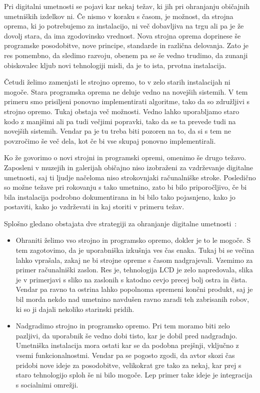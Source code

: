 \documentclass[a4paper, 12pt]{book}
\begin{document}
Pri digitalni umetnosti se pojavi kar nekaj težav, ki jih pri ohranjanju
običajnih umetniških izdelkov ni. Če nismo v koraku s časom, je možnost, da
strojna oprema, ki jo potrebujemo za instalacijo, ni več dobavljiva na trgu
ali pa je že dovolj stara, da ima zgodovinsko vrednost. Nova strojna oprema
doprinese še programske posodobitve, nove principe, standarde in različna
delovanja. Zato je res pomembno, da sledimo razvoju, obenem pa se še vedno
trudimo, da zunanji obiskovalec kljub novi tehnologiji misli, da je to ista,
prvotna instalacija.

Četudi želimo zamenjati le strojno opremo, to v zelo starih instalacijah
ni mogoče. Stara programska oprema ne deluje vedno na novejših sistemih.
V tem primeru smo prisiljeni ponovno implementirati algoritme, tako da so
združljivi s strojno opremo. Tukaj obstaja več možnosti. Vedno lahko
uporabljamo staro kodo z manjšimi ali pa tudi večjimi popravki, tako da
se ta prevede tudi na novejših sistemih. Vendar pa je tu treba biti pozoren na
to, da si s tem ne povzročimo še več dela, kot če bi vse skupaj ponovno
implementirali.

Ko že govorimo o novi strojni in programski opremi, omenimo še drugo
težavo. Zaposleni v muzejih in galerijah običajno niso izobraženi za
vzdr\-že\-va\-nje digitalne umetnosti, saj ti ljudje načeloma niso strokovnjaki
računalniške stroke. Posledično so možne težave pri rokovanju s tako umetnino,
zato bi bilo priporočljivo, če bi bila instalacija podrobno dokumentirana in
bi bilo tako pojasnjeno, kako jo postaviti, kako jo vzdrževati in kaj storiti v
primeru težav.

Splošno gledano obstajata dve strategiji za ohranjanje digitalne umetnosti~\cite{ZKM}:
\begin{itemize}
\item
Ohraniti želimo vso strojno in programsko
opremo, dokler je to le mogoče. S tem zagotovimo, da je uporabniška izkušnja
ves čas enaka. Tukaj bi se večina lahko vprašala, zakaj ne bi strojne opreme s
časom nadgrajevali. Vzemimo za primer računalniški zaslon. Res je, tehnologija
LCD je zelo napredovala, slika je v primerjavi s sliko na zaslonih s katodno
cevjo precej bolj ostra in čista. Vendar pa ravno ta ostrina lahko
popolnoma spremeni končni produkt, saj je bil morda nekdo nad umetnino
navdušen ravno zaradi teh zabrisanih robov, ki so ji dajali nekoliko starinski
pridih.

\item
Nadgradimo strojno in programsko opremo. Pri tem
moramo biti zelo pazljivi, da uporabnik še vedno dobi tisto, kar je dobil pred
nadgradnjo. Umetniška instalacija mora ostati kar se da podobna prejšnji,
vključno z vsemi funkcionalnostmi. Vendar pa se pogosto zgodi, da avtor skozi
čas pridobi nove ideje za posodobitve, velikokrat gre tako za nekaj, kar prej
s staro tehnologijo sploh še ni bilo mogoče. Lep primer take ideje je
integracija s socialnimi omrežji.
\end{itemize}
\end{document}
